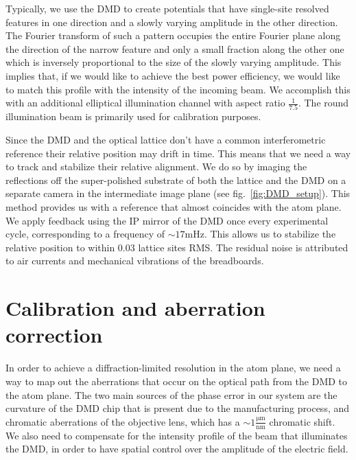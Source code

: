Typically, we use the DMD to create potentials that have single-site resolved features in one direction and a slowly varying amplitude in the other direction. The Fourier transform of such a pattern occupies the entire Fourier plane along the direction of the narrow feature and only a small fraction along the other one which is inversely proportional to the size of the slowly varying amplitude. This implies that, if we would like to achieve the best power efficiency, we would like to match this profile with the intensity of the incoming beam. We accomplish this with an additional elliptical illumination channel with aspect ratio $\frac{1}{7.5}$. The round illumination beam is primarily used for calibration purposes.

Since the DMD and the optical lattice don't have a common interferometric reference their relative position may drift in time. This means that we need a way to track and stabilize their relative alignment. We do so by imaging the reflections off the super-polished substrate of both the lattice and the DMD on a separate camera in the intermediate image plane (see fig.~\ref{fig:DMD_setup}). This method provides us with a reference that almost coincides with the atom plane. We apply feedback using the IP mirror of the DMD once every experimental cycle, corresponding to a frequency of $\sim 17 \mathrm{mHz}$. This allows us to stabilize the relative position to within $0.03$ lattice sites RMS. The residual noise is attributed to air currents and mechanical vibrations of the breadboards.

\section{Calibration and aberration correction}
In order to achieve a diffraction-limited resolution in the atom plane, we need a way to map out the aberrations that occur on the optical path from the DMD to the atom plane. The two main sources of the phase error in our system are the curvature of the DMD chip that is present due to the manufacturing process, and chromatic aberrations of the objective lens, which has a $\sim 1 \frac{\mathrm{\mu m}}{\mathrm{nm}} $ chromatic shift. We also need to compensate for the intensity profile of the beam that illuminates the DMD, in order to have spatial control over the amplitude of the electric field.

